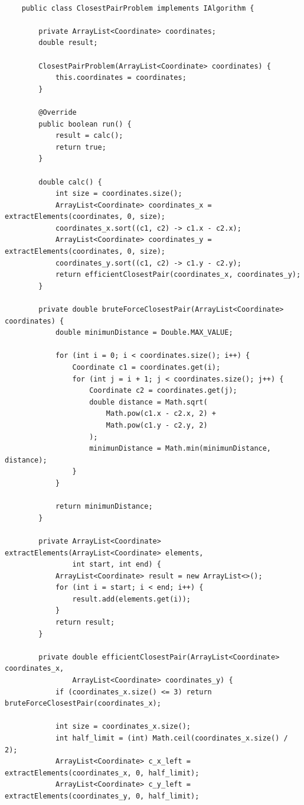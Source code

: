 \documentclass[paper=a4, fontsize=11pt]{scrartcl} %
\numberwithin{equation}{section} %
\numberwithin{figure}{section} %
\numberwithin{table}{section} %
\begin{document}
\begin{lstlisting}

    public class ClosestPairProblem implements IAlgorithm {

        private ArrayList<Coordinate> coordinates;
        double result;

        ClosestPairProblem(ArrayList<Coordinate> coordinates) {
            this.coordinates = coordinates;
        }

        @Override
        public boolean run() {
            result = calc();
            return true;
        }

        double calc() {
            int size = coordinates.size();
            ArrayList<Coordinate> coordinates_x = extractElements(coordinates, 0, size);
            coordinates_x.sort((c1, c2) -> c1.x - c2.x);
            ArrayList<Coordinate> coordinates_y = extractElements(coordinates, 0, size);
            coordinates_y.sort((c1, c2) -> c1.y - c2.y);
            return efficientClosestPair(coordinates_x, coordinates_y);
        }

        private double bruteForceClosestPair(ArrayList<Coordinate> coordinates) {
            double minimunDistance = Double.MAX_VALUE;

            for (int i = 0; i < coordinates.size(); i++) {
                Coordinate c1 = coordinates.get(i);
                for (int j = i + 1; j < coordinates.size(); j++) {
                    Coordinate c2 = coordinates.get(j);
                    double distance = Math.sqrt(
                        Math.pow(c1.x - c2.x, 2) +
                        Math.pow(c1.y - c2.y, 2)
                    );
                    minimunDistance = Math.min(minimunDistance, distance);
                }
            }

            return minimunDistance;
        }

        private ArrayList<Coordinate> extractElements(ArrayList<Coordinate> elements,
                int start, int end) {
            ArrayList<Coordinate> result = new ArrayList<>();
            for (int i = start; i < end; i++) {
                result.add(elements.get(i));
            }
            return result;
        }

        private double efficientClosestPair(ArrayList<Coordinate> coordinates_x,
                ArrayList<Coordinate> coordinates_y) {
            if (coordinates_x.size() <= 3) return bruteForceClosestPair(coordinates_x);

            int size = coordinates_x.size();
            int half_limit = (int) Math.ceil(coordinates_x.size() / 2);
            ArrayList<Coordinate> c_x_left = extractElements(coordinates_x, 0, half_limit);
            ArrayList<Coordinate> c_y_left = extractElements(coordinates_y, 0, half_limit);


\end{lstlisting}
\end{document}
